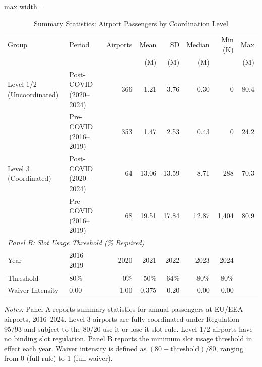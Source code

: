 \begin{table}[t]
\centering
\caption{Summary Statistics: Airport Passengers by Coordination Level}
\label{tab:summary}
\small
\begin{adjustbox}{max width=\textwidth}
\begin{tabular}{llrrrrrr}
\toprule
Group & Period & Airports & Mean & SD & Median & Min (K) & Max \\
 & & & (M) & (M) & (M) & & (M) \\
\midrule
Level 1/2 (Uncoordinated) & Post-COVID (2020--2024) & 366 & 1.21 & 3.76 & 0.30 & 0 & 80.4 \\
 & Pre-COVID (2016--2019) & 353 & 1.47 & 2.53 & 0.43 & 0 & 24.2 \\
\midrule
Level 3 (Coordinated) & Post-COVID (2020--2024) & 64 & 13.06 & 13.59 & 8.71 & 288 & 70.3 \\
 & Pre-COVID (2016--2019) & 68 & 19.51 & 17.84 & 12.87 & 1,404 & 80.9 \\
\midrule
\multicolumn{8}{l}{\textit{Panel B: Slot Usage Threshold (\% Required)}} \\
\midrule
Year & 2016--2019 & 2020 & 2021 & 2022 & 2023 & 2024 & \\
Threshold & 80\% & 0\% & 50\% & 64\% & 80\% & 80\% & \\
Waiver Intensity & 0.00 & 1.00 & 0.375 & 0.20 & 0.00 & 0.00 & \\
\bottomrule
\end{tabular}
\end{adjustbox}
\par\vspace{0.3em}
{\footnotesize \textit{Notes:} Panel A reports summary statistics for annual passengers at EU/EEA airports, 2016--2024.
Level 3 airports are fully coordinated under Regulation 95/93 and subject to the 80/20 use-it-or-lose-it slot rule.
Level 1/2 airports have no binding slot regulation.
Panel B reports the minimum slot usage threshold in effect each year.
Waiver intensity is defined as $(80 - \text{threshold}) / 80$, ranging from 0 (full rule) to 1 (full waiver).}
\end{table}
